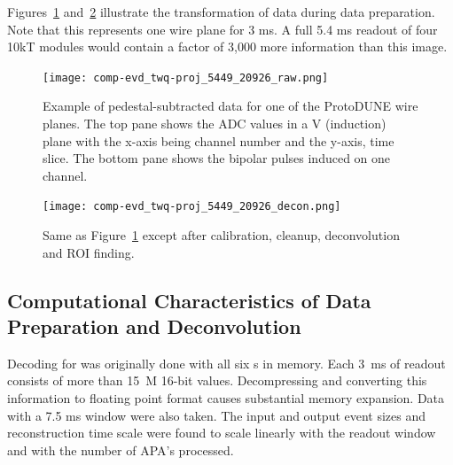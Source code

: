 Figures~\ref{fig:ch-exec-comp-chtraw} and~\ref{fig:ch-exec-comp-chtroi} illustrate the transformation of  data  during data preparation. Note that this represents one wire plane for 3 ms.  A full 5.4 ms readout of four 10kT modules would contain a factor of 3,000 more information than this image.

\begin{figure}[t]
\texttt{[image: comp-evd\_twq-proj\_5449\_20926\_raw.png]}
\caption{Example of pedestal-subtracted data for one of the ProtoDUNE  wire planes.  The top pane shows the ADC values in a V (induction) plane with the x-axis being channel number and the y-axis, time slice. The bottom pane shows the bipolar pulses induced on one channel. 
}
\label{fig:ch-exec-comp-chtraw}
\end{figure}

\begin{figure}[t]
 \texttt{[image: comp-evd\_twq-proj\_5449\_20926\_decon.png]}
\caption{
Same as Figure~\ref{fig:ch-exec-comp-chtraw} except after calibration, cleanup, deconvolution and ROI finding. 
}
\label{fig:ch-exec-comp-chtroi}
\end{figure}

\subsection{Computational Characteristics of Data Preparation and Deconvolution }
Decoding for  was originally done with all six s in memory. Each \SI{3}{ms} of  readout consists of more than \SI{15}{M} 16-bit values. Decompressing and converting this information to floating point format causes substantial memory expansion. 
  Data with a 7.5 ms window were also taken. 
The input and output event sizes and reconstruction time scale were found to scale linearly with the readout window and with the number of APA's processed. 

